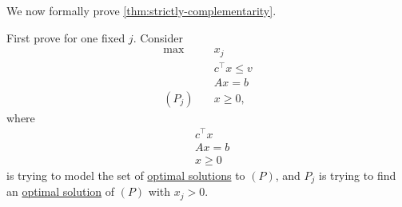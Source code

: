 We now formally prove \autoref{thm:strictly-complementarity}.
\begin{explanation}
	First prove for one fixed \(j\). Consider
	\begin{align*}
		\max~        & x_{j}            \\
		             & c^{\top}x \leq v \\
		             & Ax = b           \\
		(P_{j})\quad & x\geq 0,
	\end{align*}
	where
	\begin{align*}
		 & c^{\top}x \\
		 & Ax = b    \\
		 & x\geq 0
	\end{align*}
	is trying to model the set of \hyperref[def:optimal-solution]{optimal solutions} to \((P)\), and \(P_{j}\) is trying to find an \hyperref[def:optimal-solution]{optimal solution}
	of \((P)\) with \(x_{j}>0\).


\end{explanation}
